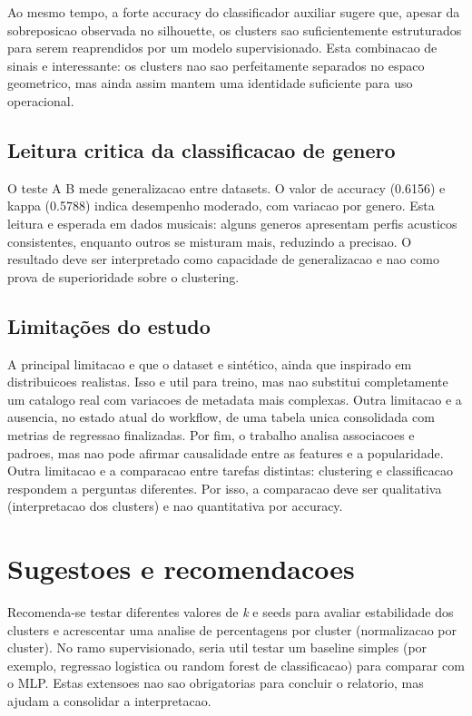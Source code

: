 \documentclass[11pt,a4paper]{article}
\begin{document}
Ao mesmo tempo, a forte accuracy do classificador auxiliar sugere que, apesar da sobreposicao observada no silhouette, os clusters sao suficientemente estruturados para serem reaprendidos por um modelo supervisionado. Esta combinacao de sinais e interessante: os clusters nao sao perfeitamente separados no espaco geometrico, mas ainda assim mantem uma identidade suficiente para uso operacional.

\subsection{Leitura critica da classificacao de genero}
O teste A \textrightarrow B mede generalizacao entre datasets. O valor de accuracy (0.6156) e kappa (0.5788) indica desempenho moderado, com variacao por genero. Esta leitura e esperada em dados musicais: alguns generos apresentam perfis acusticos consistentes, enquanto outros se misturam mais, reduzindo a precisao. O resultado deve ser interpretado como capacidade de generalizacao e nao como prova de superioridade sobre o clustering.

\subsection{Limitações do estudo}
A principal limitacao e que o dataset e sintético, ainda que inspirado em distribuicoes realistas. Isso e util para treino, mas nao substitui completamente um catalogo real com variacoes de metadata mais complexas. Outra limitacao e a ausencia, no estado atual do workflow, de uma tabela unica consolidada com metrias de regressao finalizadas. Por fim, o trabalho analisa associacoes e padroes, mas nao pode afirmar causalidade entre as features e a popularidade.
Outra limitacao e a comparacao entre tarefas distintas: clustering e classificacao respondem a perguntas diferentes. Por isso, a comparacao deve ser qualitativa (interpretacao dos clusters) e nao quantitativa por accuracy.

\section{Sugestoes e recomendacoes}
Recomenda-se testar diferentes valores de \textit{k} e seeds para avaliar estabilidade dos clusters e acrescentar uma analise de percentagens por cluster (normalizacao por cluster). No ramo supervisionado, seria util testar um baseline simples (por exemplo, regressao logistica ou random forest de classificacao) para comparar com o MLP. Estas extensoes nao sao obrigatorias para concluir o relatorio, mas ajudam a consolidar a interpretacao.
\end{document}
